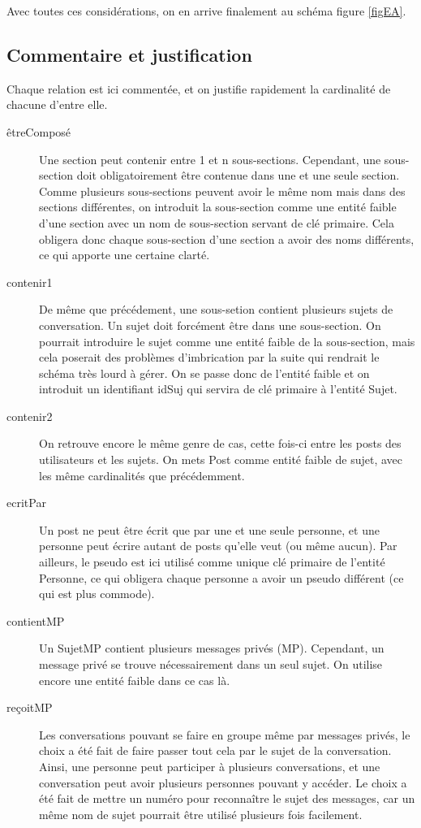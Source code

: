 \bigskip
Avec toutes ces considérations, on en arrive finalement au schéma figure \ref{figEA}.\\


\clearpage
\subsection{Commentaire et justification}
Chaque relation est ici commentée, et on justifie rapidement la cardinalité de chacune d'entre elle.
\begin{description}
	\item[êtreComposé] Une section peut contenir entre 1 et n sous-sections. Cependant, une sous-section doit obligatoirement être contenue dans une et une seule section. Comme plusieurs sous-sections peuvent avoir le même nom mais dans des sections différentes, on introduit la sous-section comme une entité faible d'une section avec un nom de sous-section servant de clé primaire. Cela obligera donc chaque sous-section d'une section a avoir des noms différents, ce qui apporte une certaine clarté. 
	\item[contenir1] De même que précédement, une sous-setion contient plusieurs sujets de conversation. Un sujet doit forcément être dans une sous-section. On pourrait introduire le sujet comme une entité faible de la sous-section, mais cela poserait des problèmes d'imbrication par la suite qui rendrait le schéma très lourd à gérer. On se passe donc de l'entité faible et on introduit un identifiant idSuj qui servira de clé primaire à l'entité Sujet.
	\item[contenir2] On retrouve encore le même genre de cas, cette fois-ci entre les posts des utilisateurs et les sujets. On mets Post comme entité faible de sujet, avec les même cardinalités que précédemment.
	\item[ecritPar] Un post ne peut être écrit que par une et une seule personne, et une personne peut écrire autant de posts qu'elle veut (ou même aucun). Par ailleurs, le pseudo est ici utilisé comme unique clé primaire de l'entité Personne, ce qui obligera chaque personne a avoir un pseudo différent (ce qui est plus commode).
	\item[contientMP] Un SujetMP contient plusieurs messages privés (MP). Cependant, un message privé se trouve nécessairement dans un seul sujet. On utilise encore une entité faible dans ce cas là.
	\item[reçoitMP] Les conversations pouvant se faire en groupe même par messages privés, le choix a été fait de faire passer tout cela par le sujet de la conversation. Ainsi, une personne peut participer à plusieurs conversations, et une conversation peut avoir plusieurs personnes pouvant y accéder. Le choix a été fait de mettre un numéro pour reconnaître le sujet des messages, car un même nom de sujet pourrait être utilisé plusieurs fois facilement.

\end{description}
